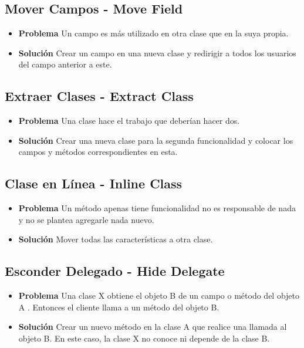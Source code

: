\documentclass[11pt,a4paper,oneside]{book}
\begin{document}
\subsection{Mover Campos - Move Field}
\begin{itemize}
    \item \textbf{Problema} Un campo es más utilizado en otra clase que en la suya propia.
    \item \textbf{Solución} Crear un campo en una nueva clase y redirigir a todos los usuarios del campo anterior a este.
\end{itemize}
    
\subsection{Extraer Clases - Extract Class}
\begin{itemize}
    \item \textbf{Problema} Una clase hace el trabajo que deberían hacer dos.
    \item \textbf{Solución} Crear una nueva clase para la segunda funcionalidad y colocar los campos y métodos correspondientes en esta.
\end{itemize}
    
\subsection{Clase en Línea - Inline Class}
\begin{itemize}
    \item \textbf{Problema} Un método apenas tiene funcionalidad no es responsable de nada y no se plantea agregarle nada nuevo.
    \item \textbf{Solución} Mover todas las características a otra clase.
\end{itemize}
    
\subsection{Esconder Delegado - Hide Delegate}
\begin{itemize}
    \item \textbf{Problema} Una clase X obtiene el objeto B de un campo o método del objeto A . Entonces el cliente llama a un método del objeto B.
    \item \textbf{Solución} Crear un nuevo método en la clase A que realice una llamada al objeto B. En este caso, la clase X no conoce ni depende de la clase B.
\end{itemize}
\end{document}
